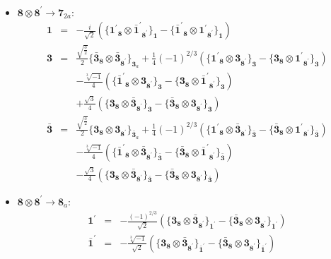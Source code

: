 \documentclass[english]{article}
\newcommand{\subcg}[3]{\big\{ {#1}\otimes{#2}\big\}^{}_{#3}}
\newcommand{\rep}[1]{\mathbf{#1}}
\begin{document}
\begin{itemize}
\begin{eqnarray*}
\end{eqnarray*}
\item $\rep{8}\otimes\rep{8^{\prime}}\to\rep{7}_{2a}$:
\begin{eqnarray*}
\rep{1} &=& -\frac{i}{\sqrt{2}}\left(\subcg{\rep{1^{\prime}}_{\rep{8}}}{\rep{\bar{1}^{\prime}}_{\rep{8^{\prime}}}}{\rep{1}}-\subcg{\rep{\bar{1}^{\prime}}_{\rep{8}}}{\rep{1^{\prime}}_{\rep{8^{\prime}}}}{\rep{1}}\right)
\\
\rep{3} &=& \frac{\sqrt{\frac{3}{2}}}{2}\subcg{\rep{\bar{3}}_{\rep{8}}}{\rep{\bar{3}}_{\rep{8^{\prime}}}}{\rep{3}_{a}}+\frac{1}{4} (-1)^{2/3}\left(\subcg{\rep{1^{\prime}}_{\rep{8}}}{\rep{3}_{\rep{8^{\prime}}}}{\rep{3}}-\subcg{\rep{3}_{\rep{8}}}{\rep{1^{\prime}}_{\rep{8^{\prime}}}}{\rep{3}}\right) \\ 
 & & -\frac{\sqrt[3]{-1}}{4}\left(\subcg{\rep{\bar{1}^{\prime}}_{\rep{8}}}{\rep{3}_{\rep{8^{\prime}}}}{\rep{3}}-\subcg{\rep{3}_{\rep{8}}}{\rep{\bar{1}^{\prime}}_{\rep{8^{\prime}}}}{\rep{3}}\right) \\ 
 & & +\frac{\sqrt{3}}{4}\left(\subcg{\rep{3}_{\rep{8}}}{\rep{\bar{3}}_{\rep{8^{\prime}}}}{\rep{3}}-\subcg{\rep{\bar{3}}_{\rep{8}}}{\rep{3}_{\rep{8^{\prime}}}}{\rep{3}}\right)
\\
\rep{\bar{3}} &=& \frac{\sqrt{\frac{3}{2}}}{2}\subcg{\rep{3}_{\rep{8}}}{\rep{3}_{\rep{8^{\prime}}}}{\rep{\bar{3}}_{a}}+\frac{1}{4} (-1)^{2/3}\left(\subcg{\rep{1^{\prime}}_{\rep{8}}}{\rep{\bar{3}}_{\rep{8^{\prime}}}}{\rep{\bar{3}}}-\subcg{\rep{\bar{3}}_{\rep{8}}}{\rep{1^{\prime}}_{\rep{8^{\prime}}}}{\rep{\bar{3}}}\right) \\ 
 & & -\frac{\sqrt[3]{-1}}{4}\left(\subcg{\rep{\bar{1}^{\prime}}_{\rep{8}}}{\rep{\bar{3}}_{\rep{8^{\prime}}}}{\rep{\bar{3}}}-\subcg{\rep{\bar{3}}_{\rep{8}}}{\rep{\bar{1}^{\prime}}_{\rep{8^{\prime}}}}{\rep{\bar{3}}}\right) \\ 
 & & -\frac{\sqrt{3}}{4}\left(\subcg{\rep{3}_{\rep{8}}}{\rep{\bar{3}}_{\rep{8^{\prime}}}}{\rep{\bar{3}}}-\subcg{\rep{\bar{3}}_{\rep{8}}}{\rep{3}_{\rep{8^{\prime}}}}{\rep{\bar{3}}}\right)
\end{eqnarray*}
\item $\rep{8}\otimes\rep{8^{\prime}}\to\rep{8}_{a}$:
\begin{eqnarray*}
\rep{1^{\prime}} &=& -\frac{(-1)^{2/3}}{\sqrt{2}}\left(\subcg{\rep{3}_{\rep{8}}}{\rep{\bar{3}}_{\rep{8^{\prime}}}}{\rep{1^{\prime}}}-\subcg{\rep{\bar{3}}_{\rep{8}}}{\rep{3}_{\rep{8^{\prime}}}}{\rep{1^{\prime}}}\right)
\\
\rep{\bar{1}^{\prime}} &=& -\frac{\sqrt[3]{-1}}{\sqrt{2}}\left(\subcg{\rep{3}_{\rep{8}}}{\rep{\bar{3}}_{\rep{8^{\prime}}}}{\rep{\bar{1}^{\prime}}}-\subcg{\rep{\bar{3}}_{\rep{8}}}{\rep{3}_{\rep{8^{\prime}}}}{\rep{\bar{1}^{\prime}}}\right)

\end{eqnarray*}
\end{itemize}
\end{document}
